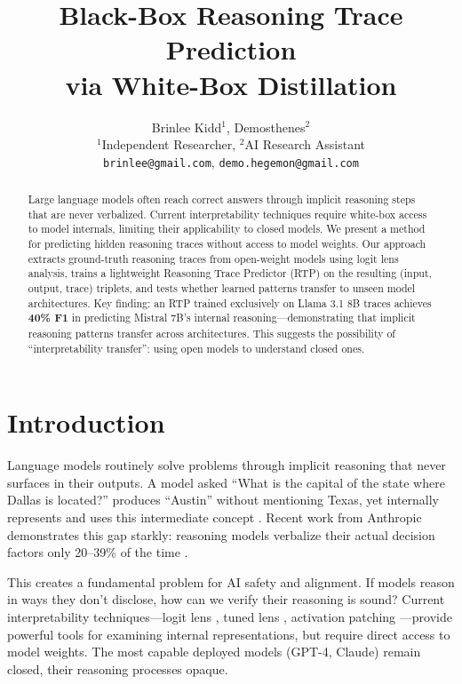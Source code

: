 \documentclass{article}
\title{Black-Box Reasoning Trace Prediction\\via White-Box Distillation}
\author{
  Brinlee Kidd$^1$, Demosthenes$^2$\\
  $^1$Independent Researcher, $^2$AI Research Assistant\\
  \texttt{brinlee@gmail.com}, \texttt{demo.hegemon@gmail.com}
}
\date{}
\begin{document}
\maketitle

\begin{abstract}
Large language models often reach correct answers through implicit reasoning steps that are never verbalized. Current interpretability techniques require white-box access to model internals, limiting their applicability to closed models. We present a method for predicting hidden reasoning traces without access to model weights. Our approach extracts ground-truth reasoning traces from open-weight models using logit lens analysis, trains a lightweight Reasoning Trace Predictor (RTP) on the resulting (input, output, trace) triplets, and tests whether learned patterns transfer to unseen model architectures. Key finding: an RTP trained exclusively on Llama 3.1 8B traces achieves \textbf{40\% F1} in predicting Mistral 7B's internal reasoning---demonstrating that implicit reasoning patterns transfer across architectures. This suggests the possibility of ``interpretability transfer'': using open models to understand closed ones.
\end{abstract}

\section{Introduction}

Language models routinely solve problems through implicit reasoning that never surfaces in their outputs. A model asked ``What is the capital of the state where Dallas is located?'' produces ``Austin'' without mentioning Texas, yet internally represents and uses this intermediate concept \cite{nostalgebraist2020}. Recent work from Anthropic demonstrates this gap starkly: reasoning models verbalize their actual decision factors only 20--39\% of the time \cite{chen2025faithfulness}.

This creates a fundamental problem for AI safety and alignment. If models reason in ways they don't disclose, how can we verify their reasoning is sound? Current interpretability techniques---logit lens \cite{nostalgebraist2020}, tuned lens \cite{belrose2023}, activation patching \cite{meng2022}---provide powerful tools for examining internal representations, but require direct access to model weights. The most capable deployed models (GPT-4, Claude) remain closed, their reasoning processes opaque.
\end{document}
